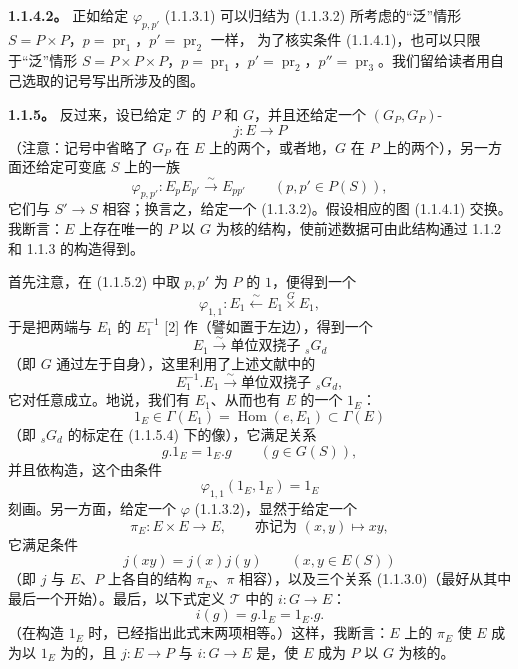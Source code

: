 \textbf{1.1.4.2。} 正如给定 $\varphi_{p,p'}$ (1.1.3.1) 可以归结为 (1.1.3.2) 所考虑的“泛”情形 $S=P\times P$，$p=\operatorname{pr}_1$，$p'=\operatorname{pr}_2$ 一样，
为了核实条件 (1.1.4.1)，也可以只限于“泛”情形 $S=P\times P\times P$，$p=\operatorname{pr}_1$，$p'=\operatorname{pr}_2$，$p''=\operatorname{pr}_3$。我们留给读者用自己选取的记号写出所涉及的图。

\textbf{1.1.5。} 反过来，设已给定 $\mathcal T$ 的 $P$ 和 $G$，并且还给定一个 $(G_P,G_P)$-
\[
j:E\longrightarrow P
\tag{1.1.5.1}
\]
（注意：记号中省略了 $G_P$ 在 $E$ 上的两个，或者地，$G$ 在 $P$ 上的两个），另一方面还给定可变底 $S$ 上的一族
\[
\varphi_{p,p'}:E_pE_{p'}\xrightarrow{\sim}E_{pp'}\qquad(p,p'\in P(S)),
\tag{1.1.5.2}
\]
它们与 $S'\to S$ 相容；换言之，给定一个 (1.1.3.2)。假设相应的图 (1.1.4.1) 交换。我断言：$E$ 上存在唯一的 $P$ 以 $G$ 为核的结构，使前述数据可由此结构通过 1.1.2 和 1.1.3 的构造得到。

首先注意，在 (1.1.5.2) 中取 $p,p'$ 为 $P$ 的 $1$，便得到一个
\[
\varphi_{1,1}:E_1\xleftarrow{\sim}E_1\mathbin{\overset G\times}E_1,
\tag{1.1.5.3}
\]
于是把两端与 $E_1$ 的 $E_1^{-1}$ [2] 作（譬如置于左边），得到一个
\[
E_1\xrightarrow{\sim}\text{单位双挠子 }{}_sG_d
\tag{1.1.5.4}
\]
（即 $G$ 通过左于自身），这里利用了上述文献中的
\[
E_1^{-1}.E_1\xrightarrow{\sim}\text{单位双挠子 }{}_sG_d,
\]
它对任意成立。地说，我们有 $E_1$、从而也有 $E$ 的一个 $1_E$：
\[
1_E\in\Gamma(E_1)=\operatorname{Hom}(e,E_1)\subset\Gamma(E)
\tag{1.1.5.5}
\]
（即 ${}_sG_d$ 的标定在 (1.1.5.4) 下的像），它满足关系
\[
g.1_E=1_E.g\qquad(g\in G(S)),
\]
并且依构造，这个由条件
\[
\varphi_{1,1}(1_E,1_E)=1_E
\tag{1.1.5.6}
\]
刻画。另一方面，给定一个 $\varphi$ (1.1.3.2)，显然于给定一个
\[
\pi_E:E\times E\longrightarrow E,\qquad\text{亦记为 }(x,y)\longmapsto xy,
\tag{1.1.5.7}
\]
它满足条件
\[
j(xy)=j(x)j(y)\qquad(x,y\in E(S))
\tag{1.1.5.8}
\]
（即 $j$ 与 $E$、$P$ 上各自的结构 $\pi_E$、$\pi$ 相容），以及三个关系 (1.1.3.0)（最好从其中最后一个开始）。最后，以下式定义 $\mathcal T$ 中的 $i:G\to E$：
\[
i(g)=g.1_E=1_E.g.
\tag{1.1.5.9}
\]
（在构造 $1_E$ 时，已经指出此式末两项相等。）这样，我断言：$E$ 上的 $\pi_E$ 使 $E$ 成为以 $1_E$ 为的，且 $j:E\to P$ 与 $i:G\to E$ 是，使 $E$ 成为 $P$ 以 $G$ 为核的。

